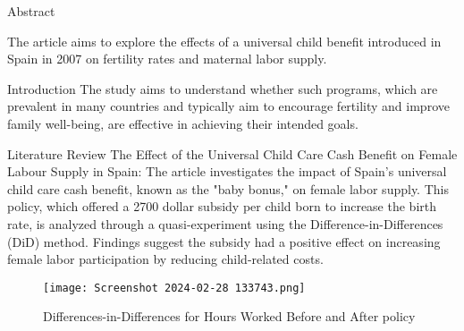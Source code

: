 \begin{frame}[t]

\begin{block}{}
\centering
\maketitle
\end{block}

\begin{columns}[T] %

\begin{column}{.32\textwidth}
    \begin{block}{\Huge Abstract} %


    \Large %
The article aims to explore the effects of a universal child benefit introduced in Spain in 2007 on fertility rates and maternal labor supply. 
    \normalsize 
    \end{block}

    \vspace{1cm} %

    \begin{block}{\Huge Introduction} %
    \Large %
The study aims to understand whether such programs, which are prevalent in many countries and typically aim to encourage fertility and improve family well-being, are effective in achieving their intended goals.     \normalsize 
    \end{block}

    \vspace{1cm} %

    \begin{block}{\Huge Literature Review} %
    \Large %
   The Effect of the Universal Child Care Cash Benefit on Female Labour Supply in Spain:
   The article investigates the impact of Spain's universal child care cash benefit, known as the "baby bonus," on female labor supply. This policy, which offered a 2700 dollar subsidy per child born to increase the birth rate, is analyzed through a quasi-experiment using the Difference-in-Differences (DiD) method. Findings suggest the subsidy had a positive effect on increasing female labor participation by reducing child-related costs.
\begin{figure}
        \centering
        \texttt{[image: Screenshot 2024-02-28 133743.png]}
        \caption{Differences-in-Differences for Hours Worked Before and After policy}
        \label{fig:enter-label}
    \end{figure}
    \normalsize
    \end{block}
\end{column}


\end{columns}
\end{frame}
